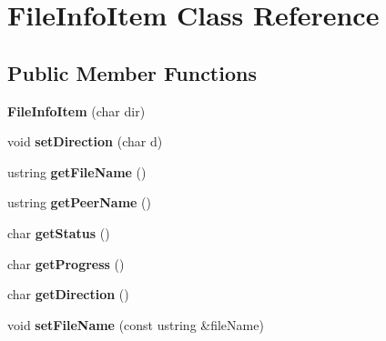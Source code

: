 \hypertarget{classFileInfoItem}{\section{\-File\-Info\-Item \-Class \-Reference}
\label{classFileInfoItem}
}
\subsection*{\-Public \-Member \-Functions}
\begin{DoxyCompactItemize}
\item 
\hypertarget{classFileInfoItem_a5be2766f93a038e8fc805dc4d5a34019}{{\bfseries \-File\-Info\-Item} (char dir)}\label{classFileInfoItem_a5be2766f93a038e8fc805dc4d5a34019}

\item 
\hypertarget{classFileInfoItem_ad876659df3324deab1f3f1bc7ce83ae0}{void {\bfseries set\-Direction} (char d)}\label{classFileInfoItem_ad876659df3324deab1f3f1bc7ce83ae0}

\item 
\hypertarget{classFileInfoItem_a953ed312e99eb60724d909e4b591db6b}{ustring {\bfseries get\-File\-Name} ()}\label{classFileInfoItem_a953ed312e99eb60724d909e4b591db6b}

\item 
\hypertarget{classFileInfoItem_a76c95aa8c991432e43aa9d6ac4c69777}{ustring {\bfseries get\-Peer\-Name} ()}\label{classFileInfoItem_a76c95aa8c991432e43aa9d6ac4c69777}

\item 
\hypertarget{classFileInfoItem_a38bb8a4728155708f2aeff5c49a4e929}{char {\bfseries get\-Status} ()}\label{classFileInfoItem_a38bb8a4728155708f2aeff5c49a4e929}

\item 
\hypertarget{classFileInfoItem_ae655153aa024500fa94eb136dc6a6656}{char {\bfseries get\-Progress} ()}\label{classFileInfoItem_ae655153aa024500fa94eb136dc6a6656}

\item 
\hypertarget{classFileInfoItem_a1b562ecc6076b19518aee38d22cca09c}{char {\bfseries get\-Direction} ()}\label{classFileInfoItem_a1b562ecc6076b19518aee38d22cca09c}

\item 
\hypertarget{classFileInfoItem_a64202d9c1cb6616c68ec2d8894a0b4b5}{void {\bfseries set\-File\-Name} (const ustring \&file\-Name)}\label{classFileInfoItem_a64202d9c1cb6616c68ec2d8894a0b4b5}


\end{DoxyCompactItemize}
